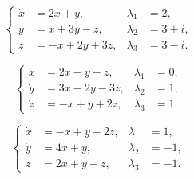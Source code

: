 \begin{problem}
	\[ \left\{ \begin{aligned} \dot x &= 2 x + y, & \lambda_1 &= 2, \\ \dot y &= x + 3 y - z, & \lambda_2 &= 3 + i, \\ \dot z &= - x + 2 y + 3 z, & \lambda_3 &= 3 - i. \end{aligned} \right. \]
\end{problem}

\begin{problem}
	\[ \left\{ \begin{aligned} \dot x &= 2 x - y - z, & \lambda_1 &= 0, \\ \dot y &= 3 x - 2 y - 3 z, & \lambda_2 &= 1, \\ \dot z &= - x + y + 2 z, & \lambda_3 &= 1. \end{aligned} \right. \]
\end{problem}

\begin{problem}
	\[ \left\{ \begin{aligned} \dot x &= -x + y - 2 z, & \lambda_1 &= 1, \\ \dot y &= 4 x + y, & \lambda_2 &= - 1, \\ \dot z &= 2 x + y - z, & \lambda_3 &= - 1. \end{aligned} \right. \]
\end{problem}
